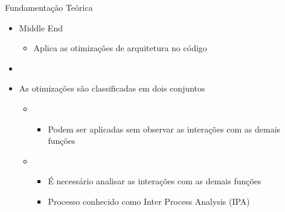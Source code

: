
\begin{frame}{Fundamentação Teórica}
  \begin{itemize}
    \item Middle End
    \begin{itemize}
        \item Aplica as otimizações {\color{blue}{independentes}} de arquitetura no código
    \end{itemize}
    \item[]
    \item As otimizações são classificadas em dois conjuntos {\color{red}{disjuntos}}
        \begin{itemize}
            \item {\color{blue}{Intra Procedural}}
                \begin{itemize}
                    \item Podem ser aplicadas sem observar as interações com as demais funções
                \end{itemize}
            \item {\color{red}{Inter Procedural}}
                \begin{itemize}
                    \item É necessário analisar as interações com as demais funções
                    \item Processo conhecido como Inter Process Analysis (IPA)
                \end{itemize}
        \end{itemize}
  \end{itemize}
\end{frame}

